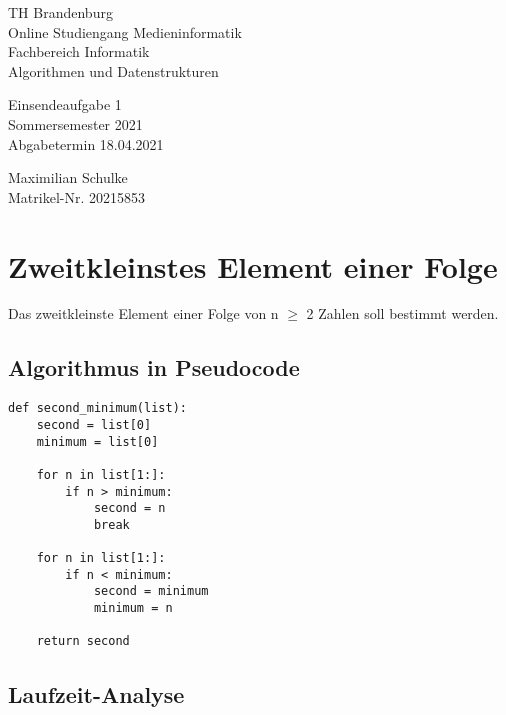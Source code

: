 \documentclass{article}
\begin{document}
\begin{titlepage}
	\begin{flushleft}
		TH Brandenburg \\
		Online Studiengang Medieninformatik \\
		Fachbereich Informatik \\
		Algorithmen und Datenstrukturen
	\end{flushleft}

	\vfill

	\begin{center}
		\Large{Einsendeaufgabe 1}\\[0.5em]
		\large{Sommersemester 2021}\\[0.25em]
		\large{Abgabetermin 18.04.2021}
	\end{center}

	\vfill

	\begin{flushright}
		Maximilian Schulke \\
		Matrikel-Nr. 20215853
	\end{flushright}
\end{titlepage}

\newpage

\section{Zweitkleinstes Element einer Folge}

Das zweitkleinste Element einer Folge von n $\geq$ 2 Zahlen soll bestimmt werden.

\subsection{Algorithmus in Pseudocode}

\begin{lstlisting}
def second_minimum(list):
    second = list[0]
    minimum = list[0]

    for n in list[1:]:
        if n > minimum:
            second = n
            break

    for n in list[1:]:
        if n < minimum:
            second = minimum
            minimum = n

    return second
\end{lstlisting}

\subsection{Laufzeit-Analyse}
\end{document}
